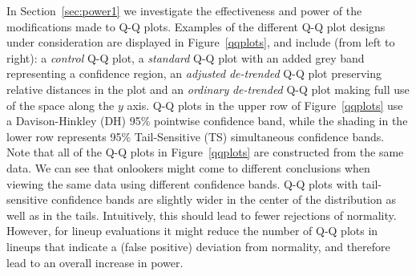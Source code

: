 \documentclass[12pt]{article}\usepackage[]{graphicx}\usepackage[]{color}
\newcommand{\hh}[1]{{\color{magenta} #1}}
\begin{document}
In Section~\ref{sec:power1} we investigate the effectiveness and power of the modifications made to Q-Q plots.
Examples of the different Q-Q plot designs under consideration are displayed in Figure~\ref{qqplots}, and include (from left to right): a \emph{control} Q-Q plot, a \emph{standard} Q-Q plot with an added grey band representing a confidence region, an \emph{adjusted} \emph{de-trended} Q-Q plot preserving relative distances in the plot and an \emph{ordinary} \emph{de-trended} Q-Q plot making full use of the space along the $y$ axis.
Q-Q plots in the upper row of Figure~\ref{qqplots} use a Davison-Hinkley (DH) 95\% pointwise confidence band, while the shading in the lower row represents 95\% Tail-Sensitive (TS) simultaneous confidence bands. 
Note that all of the Q-Q plots in Figure~\ref{qqplots} are constructed from the same data. 
\hh{We can see that onlookers might come to different conclusions when viewing the same data using different confidence bands. Q-Q plots with tail-sensitive confidence bands are slightly wider in the center of the distribution as well as in the tails. Intuitively, this should lead to fewer rejections of normality. However, for lineup evaluations it might reduce the number of Q-Q plots in lineups that indicate a (false positive) deviation from normality, and therefore lead to an overall increase in power.}
\end{document}
